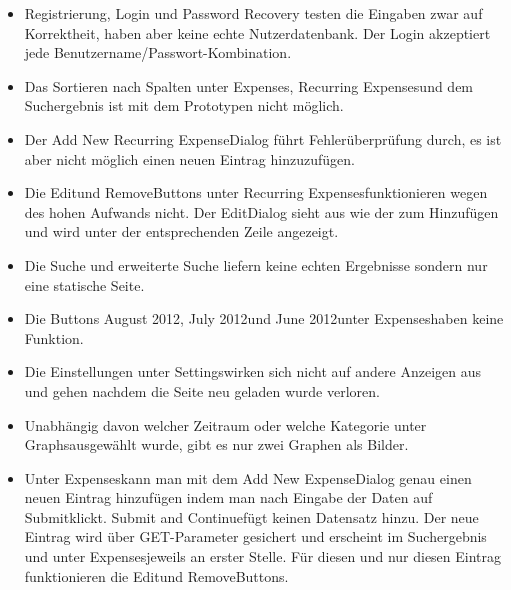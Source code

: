 \documentclass[a4paper,10pt]{article}
\begin{document}
\begin{itemize}
    \item Registrierung, Login und Password Recovery testen die Eingaben zwar auf
            Korrektheit, haben aber keine echte Nutzerdatenbank. Der Login akzeptiert
            jede Benutzername/Passwort-Kombination.
    \item Das Sortieren nach Spalten unter \glqq Expenses\grqq, \glqq
            Recurring Expenses\grqq\space und dem Suchergebnis ist mit dem Prototypen
            nicht m\"oglich.
    \item Der \glqq Add New Recurring Expense\grqq\space Dialog f\"uhrt
            Fehler\"uberpr\"ufung durch, es ist aber nicht m\"oglich einen neuen
            Eintrag hinzuzuf\"ugen.
    \item Die \glqq Edit\grqq\space und \glqq Remove\grqq\space Buttons unter \glqq
            Recurring Expenses\grqq\space funktionieren wegen des hohen Aufwands
            nicht. Der \glqq Edit\grqq\space Dialog sieht aus wie der zum
            Hinzuf\"ugen und wird unter der entsprechenden Zeile angezeigt.
    \item Die Suche und erweiterte Suche liefern keine echten Ergebnisse sondern nur
            eine statische Seite.
    \item Die Buttons \glqq August 2012\grqq, \glqq July 2012\grqq\space und \glqq
            June 2012\grqq\space unter \glqq Expenses\grqq\space haben keine
            Funktion.
    \item Die Einstellungen unter \glqq Settings\grqq\space wirken sich nicht auf
            andere Anzeigen aus und gehen nachdem die Seite neu geladen wurde
            verloren.
    \item Unabh\"angig davon welcher Zeitraum oder welche Kategorie unter \glqq
            Graphs\grqq\space ausgew\"ahlt wurde, gibt es nur zwei Graphen als
            Bilder.
    \item Unter \glqq Expenses\grqq\space kann man mit dem \glqq Add New
            Expense\grqq\space Dialog genau einen neuen Eintrag hinzuf\"ugen indem
            man nach Eingabe der Daten auf \glqq Submit\grqq\space klickt. \glqq
            Submit and Continue\grqq\space f\"ugt keinen Datensatz hinzu. Der neue
            Eintrag wird \"uber GET-Parameter gesichert und erscheint im Suchergebnis
            und unter \glqq Expenses\grqq\space jeweils an erster Stelle. F\"ur
            diesen und nur diesen Eintrag funktionieren die \glqq Edit\grqq\space und
            \glqq Remove\grqq\space Buttons.

\end{itemize}
\end{document}
